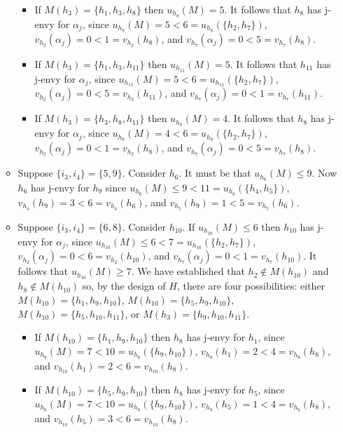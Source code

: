\begin{itemize}
\begin{itemize}
        \begin{itemize}
            \item If $M(h_3) = \{ h_1, h_3, h_8 \}$ then $u_{h_8}(M) = 5$. It follows that $h_8$ has j-envy for $\alpha_{j}$, since $u_{h_8}(M) = 5 < 6 = u_{h_8}(\{ h_2, h_7 \})$, $v_{h_2}(\alpha_{j}) = 0 < 1 = v_{h_2}(h_8)$, and $v_{h_7}(\alpha_{j}) = 0 < 5 = v_{h_7}(h_8)$.
            \item If $M(h_3) = \{ h_1, h_3, h_{11} \}$ then $u_{h_{11}}(M) = 5$. It follows that $h_{11}$ has j-envy for $\alpha_{j}$, since $u_{h_{11}}(M) = 5 < 6 = u_{h_{11}}(\{ h_2, h_7 \})$, $v_{h_2}(\alpha_{j}) = 0 < 5 = v_{h_2}(h_{11})$, and $v_{h_7}(\alpha_{j}) = 0 < 1 = v_{h_7}(h_{11})$.
            \item If $M(h_3) = \{ h_3, h_8, h_{11} \}$ then $u_{h_8}(M) = 4$. It follows that $h_8$ has j-envy for $\alpha_{j}$, since $u_{h_8}(M) = 4 < 6 = u_{h_8}(\{ h_2, h_7 \})$, $v_{h_2}(\alpha_{j}) = 0 < 1 = v_{h_2}(h_8)$, and $v_{h_7}(\alpha_{j}) = 0 < 5 = v_{h_7}(h_8)$.
        \end{itemize}
        \item Suppose $\{ {i_3}, {i_4} \} = \{ 5, 9 \}$. Consider $h_6$. It must be that $u_{h_6}(M) \leq 9$. Now $h_6$ has j-envy for $h_9$ since $u_{h_6}(M) \leq 9 < 11 = u_{h_6}(\{ h_4, h_5 \})$, $v_{h_4}(h_9) = 3 < 6 = v_{h_4}(h_6)$, and $v_{h_5}(h_9) = 1 < 5 = v_{h_5}(h_6)$.
        \item Suppose $\{ {i_3}, {i_4} \} = \{ 6, 8 \}$. Consider $h_{10}$. If $u_{h_{10}}(M) \leq 6$ then $h_{10}$ has j-envy for $\alpha_{j}$, since $u_{h_{10}}(M) \leq 6 < 7 = u_{h_{10}}(\{ h_2, h_7 \})$, $v_{h_2}(\alpha_{j}) = 0 < 6 = v_{h_2}(h_{10})$, and $v_{h_7}(\alpha_{j}) = 0 < 1 = v_{h_7}(h_{10})$. It follows that $u_{h_{10}}(M) \geq 7$. We have established that $h_2 \notin M(h_{10})$ and $h_8 \notin M(h_{10})$ so, by the design of $H$, there are four possibilities: either $M(h_{10}) = \{ h_1, h_9, h_{10} \}$, $M(h_{10}) = \{ h_5, h_9, h_{10} \}$, $M(h_{10}) = \{ h_5, h_{10}, h_{11} \}$, or $M(h_3) = \{ h_9, h_{10}, h_{11} \}$.
        \begin{itemize}
            \item If $M(h_{10}) = \{ h_1, h_9, h_{10} \}$ then $h_8$ has j-envy for $h_1$, since $u_{h_8}(M) = 7 < 10 = u_{h_8}(\{ h_9, h_{10} \})$, $v_{h_9}(h_1) = 2 < 4 = v_{h_9}(h_8)$, and $v_{h_{10}}(h_1) = 2 < 6 = v_{h_{10}}(h_8)$.
            \item If $M(h_{10}) = \{ h_5, h_9, h_{10} \}$ then $h_8$ has j-envy for $h_5$, since $u_{h_8}(M) = 7 < 10 = u_{h_8}(\{ h_9, h_{10} \})$, $v_{h_9}(h_5) = 1 < 4 = v_{h_9}(h_8)$, and $v_{h_{10}}(h_5) = 3 < 6 = v_{h_{10}}(h_8)$.

\end{itemize}
\end{itemize}
\end{itemize}
